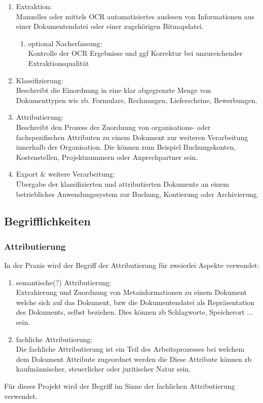 \documentclass[11pt,oneside,a4paper,notitlepage]{article}
\begin{document}
\begin{enumerate}
\item Extraktion:\\
Manuelles oder mittels OCR automatisiertes auslesen von Informationen aus einer Dokumentendatei oder einer zugehörigen Bitmapdatei.
\begin{enumerate}
\item optional Nacherfassung:\\
Kontrolle der OCR Ergebnisse und ggf Korrektur bei unzureichender Extraktionsqualität
\end{enumerate}
\item Klassifizierung:\\
Beschreibt die Einordnung in eine klar abgegrenzte Menge von Dokumenttypen wie zb. Formulare, Rechnungen, Lieferscheine, 
Bewerbungen.
\item Attributierung:\\
Beschreibt den Prozess der Zuordnung von organisations- oder fachspezifischen Attributen zu einem Dokument zur weiteren
Verarbeitung innerhalb der Organisation. Die können zum Beispiel Buchungskonten, Kostenstellen, Projektnummern oder Anprechpartner   sein.
\item Export \& weitere Verarbeitung:\\
Übergabe der klassifizierten und attributierten Dokumente an einem betriebliches Anwendungssystem zur Buchung, Kontierung oder Archivierung.
\end{enumerate}
\noindent

%
\subsection{Begrifflichkeiten}

\subsubsection{Attributierung}
In der Praxis wird der Begriff der Attributierung für zweierlei Aspekte verwendet:\\
\begin{enumerate}
\item semantische(?) Attributierung:\\
Extrahierung und Zuordnung von Metainformationen zu einem Dokument welche sich auf das Dokument, bzw die Dokumentendatei als Repräsentation des Dokuments, selbst beziehen. Dies können zb Schlagworte, Speicherort ... sein.
\item fachliche Attributierung:\\
Die fachliche Attributierung ist ein Teil des Arbeitsprozesses bei welchem dem Dokument Attribute zugeordnet werden die 
Diese Attribute können zb kaufmännischer, steuerlicher oder juritischer Natur sein.
\end{enumerate}
\noindent
Für dieses Projekt wird der Begriff im Sinne der fachlichen Attributierung verwendet.
\end{document}
